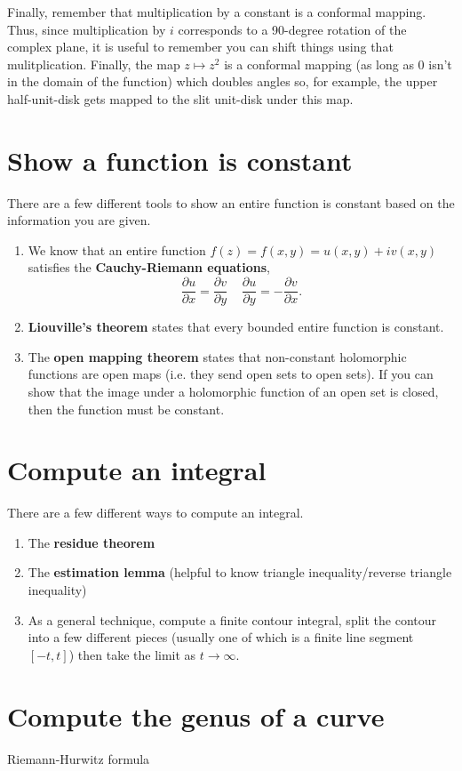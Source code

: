 \documentclass[10pt]{article}
\begin{document}
Finally, remember that multiplication by a constant is a conformal mapping. Thus, since multiplication by $i$ corresponds to a 90-degree rotation of the complex plane, it is useful to remember you can shift things using that mulitplication. Finally, the map $z \mapsto z^2$ is a conformal mapping (as long as $0$ isn't in the domain of the function) which doubles angles so, for example, the upper half-unit-disk gets mapped to the slit unit-disk under this map.

\section{Show a function is constant}

There are a few different tools to show an entire function is constant based on the information you are given.

\begin{enumerate}
\item We know that an entire function $f(z) = f(x,y) = u(x,y) + i v(x,y)$ satisfies the \textbf{Cauchy-Riemann equations},
\[ \frac{\partial u}{\partial x} = \frac{\partial v}{\partial y} \; \; \; \; \frac{\partial u}{\partial y} = - \frac{\partial v}{\partial x} .\]
\item \textbf{Liouville's theorem} states that every bounded entire function is constant.
\item The \textbf{open mapping theorem} states that non-constant holomorphic functions are open maps (i.e. they send open sets to open sets). If you can show that the image under a holomorphic function of an open set is closed, then the function must be constant.
\end{enumerate}


\section{Compute an integral}

There are a few different ways to compute an integral. 

\begin{enumerate}
	\item The \textbf{residue theorem}
	\item The \textbf{estimation lemma} (helpful to know triangle inequality/reverse triangle inequality)
	\item As a general technique, compute a finite contour integral, split the contour into a few different pieces (usually one of which is a finite line segment $[-t,t]$) then take the limit as $t \rightarrow \infty$.
\end{enumerate}

\section{Compute the genus of a curve}

Riemann-Hurwitz formula
\end{document}

